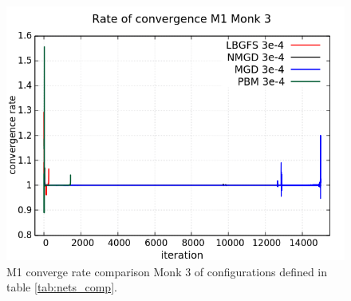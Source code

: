 \begin{figure}[H]
	\centering
	\includegraphics[width=0.6\linewidth]{data/Comparison/Monk3/Monk3_M1_CR_standard.png}
	\caption{M1 converge rate comparison Monk 3 of configurations defined in table \ref{tab:nets_comp}.}
	\label{fig:CR-M1-Monk3-Standard}
\end{figure}

